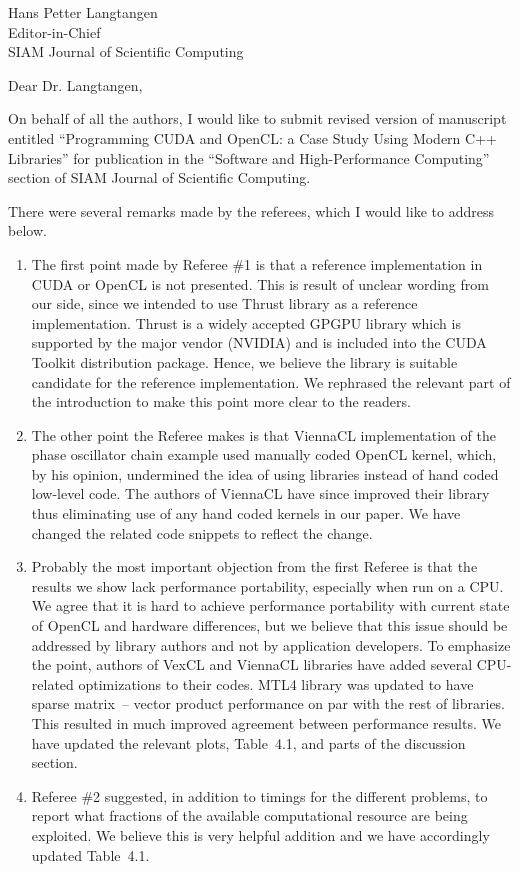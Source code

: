 \documentclass[a4paper,11pt]{letter}
\begin{document}
\begin{letter}{
    Hans Petter Langtangen\\
    Editor-in-Chief\\
    SIAM Journal of Scientific Computing
    }
\opening{Dear Dr. Langtangen,}

On behalf of all the authors, I would like to submit revised version of
manuscript entitled ``Programming CUDA and OpenCL: a Case Study Using Modern
C++ Libraries'' for publication in the ``Software and High-Performance
Computing'' section of SIAM Journal of Scientific Computing.

There were several remarks made by the referees, which I would like to address
below.

\begin{enumerate}
    \item The first point made by Referee \#1 is that a reference
        implementation in CUDA or OpenCL is not presented. This is result of
        unclear wording from our side, since we intended to use Thrust library
        as a reference implementation. Thrust is a widely accepted GPGPU
        library which is supported by the major vendor (NVIDIA) and is included
        into the CUDA Toolkit distribution package. Hence, we believe the
        library is suitable candidate for the reference implementation. We
        rephrased the relevant part of the introduction to make this point more
        clear to the readers.
    \item The other point the Referee makes is that ViennaCL implementation of
        the phase oscillator chain example used manually coded OpenCL kernel,
        which, by his opinion, undermined the idea of using libraries instead
        of hand coded low-level code. The authors of ViennaCL have since
        improved their library thus eliminating use of any hand coded kernels
        in our paper. We have changed the related code snippets to reflect the
        change.
    \item Probably the most important objection from the first Referee is that
        the results we show lack performance portability, especially when run
        on a CPU. We agree that it is hard to achieve performance portability
        with current state of OpenCL and hardware differences, but we believe
        that this issue should be addressed by library authors and not by
        application developers. To emphasize the point, authors of VexCL and
        ViennaCL libraries have added several CPU-related optimizations to
        their codes. MTL4 library was updated to have sparse matrix~-- vector
        product performance on par with the rest of libraries.  This resulted
        in much improved agreement between performance results. We have updated
        the relevant plots, Table~4.1, and parts of the discussion section.
    \item Referee \#2 suggested, in addition to timings for the different
        problems, to report what fractions of the available computational
        resource are being exploited. We believe this is very helpful addition
        and we have accordingly updated Table~4.1.
\end{enumerate}


\end{letter}
\end{document}
